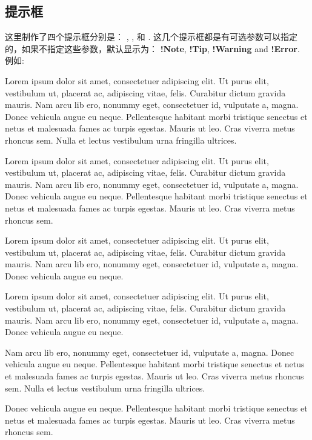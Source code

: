 \documentclass[12pt,a4paper]{report}
\begin{document}
\subsection{提示框}
这里制作了四个提示框分别是： , ,  和 . 这几个提示框都是有可选参数可以指定的，如果不指定这些参数，默认显示为： \textbf{!Note}, \textbf{!Tip}, \textbf{!Warning} and \textbf{!Error}. 例如:

\begin{note}
	Lorem ipsum dolor sit amet, consectetuer adipiscing elit. Ut purus elit, vestibulum ut, placerat ac, adipiscing vitae, felis. Curabitur dictum gravida mauris. Nam arcu lib ero, nonummy eget, consectetuer id, vulputate a, magna. Donec vehicula augue eu neque. Pellentesque habitant morbi tristique senectus et netus et malesuada fames ac turpis egestas. Mauris ut leo. Cras viverra metus rhoncus sem. Nulla et lectus vestibulum urna fringilla ultrices.
\end{note}
\begin{tip}
Lorem ipsum dolor sit amet, consectetuer adipiscing elit. Ut purus elit, vestibulum ut, placerat ac, adipiscing vitae, felis. Curabitur dictum gravida mauris. Nam arcu lib ero, nonummy eget, consectetuer id, vulputate a, magna. Donec vehicula augue eu neque. Pellentesque habitant morbi tristique senectus et netus et malesuada fames ac turpis egestas. Mauris ut leo. Cras viverra metus rhoncus sem.
\end{tip}
\begin{warning}
Lorem ipsum dolor sit amet, consectetuer adipiscing elit. Ut purus elit, vestibulum ut, placerat ac, adipiscing vitae, felis. Curabitur dictum gravida mauris. Nam arcu lib ero, nonummy eget, consectetuer id, vulputate a, magna. Donec vehicula augue eu neque.
\end{warning}
\begin{error}
Lorem ipsum dolor sit amet, consectetuer adipiscing elit. Ut purus elit, vestibulum ut, placerat ac, adipiscing vitae, felis. Curabitur dictum gravida mauris. Nam arcu lib ero, nonummy eget, consectetuer id, vulputate a, magna. Donec vehicula augue eu neque.
\end{error}
\begin{note}[注意]
	Nam arcu lib ero, nonummy eget, consectetuer id, vulputate a, magna. Donec vehicula augue eu neque. Pellentesque habitant morbi tristique senectus et netus et malesuada fames ac turpis egestas. Mauris ut leo. Cras viverra metus rhoncus sem. Nulla et lectus vestibulum urna fringilla ultrices.
\end{note}
\begin{tip}
Donec vehicula augue eu neque. Pellentesque habitant morbi tristique senectus et netus et malesuada fames ac turpis egestas. Mauris ut leo. Cras viverra metus rhoncus sem.
\end{tip}
\end{document}

